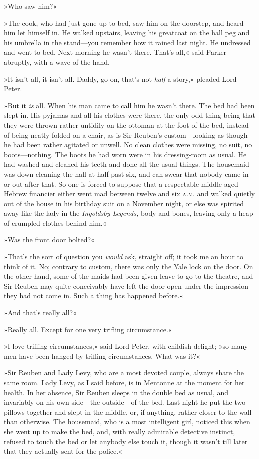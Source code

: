 »Who saw him?«

»The cook, who had just gone up to bed, saw him on the doorstep, and heard him let himself in. He walked upstairs, leaving his greatcoat on the hall peg and his umbrella in the stand—you remember how it rained last night. He undressed and went to bed. Next morning he wasn't there. That's all,« said Parker abruptly, with a wave of the hand.

»It isn't all, it isn't all. Daddy, go on, that's not \textit{half} a story,« pleaded Lord Peter.

»But it \textit{is} all. When his man came to call him he wasn't there. The bed had been slept in. His pyjamas and all his clothes were there, the only odd thing being that they were thrown rather untidily on the ottoman at the foot of the bed, instead of being neatly folded on a chair, as is Sir Reuben's custom—looking as though he had been rather agitated or unwell. No clean clothes were missing, no suit, no boots—nothing. The boots he had worn were in his dressing-room as usual. He had washed and cleaned his teeth and done all the usual things. The housemaid was down cleaning the hall at half-past six, and can swear that nobody came in or out after that. So one is forced to suppose that a respectable middle-aged Hebrew financier either went mad between twelve and six \textsc{a.m.} and walked quietly out of the house in his birthday suit on a November night, or else was spirited away like the lady in the \textit{Ingoldsby Legends,} body and bones, leaving only a heap of crumpled clothes behind him.«

»Was the front door bolted?«

»That's the sort of question you \textit{would} ask, straight off; it took me an hour to think of it. No; contrary to custom, there was only the Yale lock on the door. On the other hand, some of the maids had been given leave to go to the theatre, and Sir Reuben may quite conceivably have left the door open under the impression they had not come in. Such a thing has happened before.«

»And that's really all?«

»Really all. Except for one very trifling circumstance.«

»I love trifling circumstances,« said Lord Peter, with childish delight; »so many men have been hanged by trifling circumstances. What was it?«

»Sir Reuben and Lady Levy, who are a most devoted couple, always share the same room. Lady Levy, as I said before, is in Mentonne at the moment for her health. In her absence, Sir Reuben sleeps in the double bed as usual, and invariably on his own side—the outside—of the bed. Last night he put the two pillows together and slept in the middle, or, if anything, rather closer to the wall than otherwise. The housemaid, who is a most intelligent girl, noticed this when she went up to make the bed, and, with really admirable detective instinct, refused to touch the bed or let anybody else touch it, though it wasn't till later that they actually sent for the police.«

